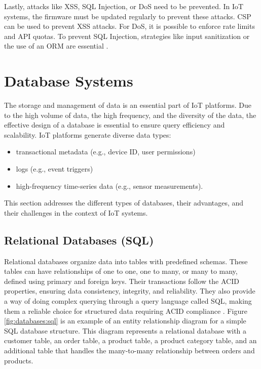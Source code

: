 Lastly, attacks like \gls{XSS}, \gls{SQL} Injection, or \gls{DoS} need to be prevented.
In \gls{IoT} systems, the firmware must be updated regularly to prevent these
attacks.
\gls{CSP} can be used to prevent \gls{XSS} attacks. For \gls{DoS}, it is possible to enforce
rate limits and \gls{API} quotas. To prevent \gls{SQL} Injection, strategies like
input sanitization or the use of an \gls{ORM} are essential \cite{schiller2022landscape}.

\section{Database Systems}
The storage and management of data is an essential part of \gls{IoT} platforms.
Due to the high volume of data, the high frequency, and the diversity of the
data, the effective design of a database is essential to ensure query efficiency
and scalability.
\gls{IoT} platforms generate diverse data types:
\begin{itemize}
	\item transactional metadata (e.g., device \gls{ID}, user permissions)
	\item logs (e.g., event triggers)
	\item high-frequency time-series data (e.g., sensor measurements).
\end{itemize}

This section addresses the different types of databases, their advantages, and
their challenges in the context of \gls{IoT} systems.

\subsection{Relational Databases (SQL)}
Relational databases organize data into tables with predefined schemas.
These tables can have relationships of one to one, one to many, or many to many,
defined using primary and foreign keys. Their transactions follow the \gls{ACID}
properties, ensuring data
consistency, integrity, and reliability. They also provide a way of
doing complex querying through a query language called \gls{SQL}, making them
a reliable choice for structured data requiring \gls{ACID} compliance \cite{bdcc7020097, Yadav2024}.
Figure \ref{fig:databases:sql}
is an example of an entity relationship diagram for a simple \gls{SQL} database structure.
This diagram represents a relational database with a customer table, an order table, a product table, a product
category table, and an additional table that handles the many-to-many
relationship between orders and products.

